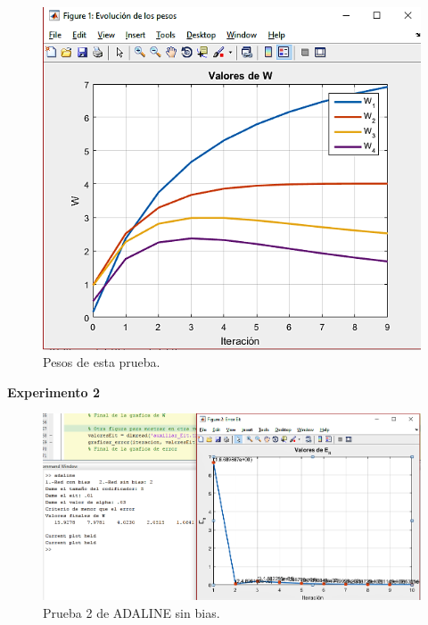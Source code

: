 \documentclass[12pt, titlepage]{article}
\begin{document}
            \begin{figure}[H]
                \begin{center}
                    \includegraphics[width=16cm]{img/adaline3/pesosbias.png}
                    \caption{Pesos de esta prueba.}
                    \label{fig:adaline3pesos}
                \end{center}
            \end{figure}
        \textbf{Experimento 2}
        \begin{figure}[H]
            \begin{center}
                \includegraphics[width=16cm]{img/adaline4/error.png}
                \caption{Prueba 2 de ADALINE sin bias.}
                \label{fig:adaline4error}
            \end{center}
        \end{figure}
        
\end{document}
